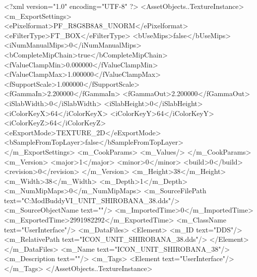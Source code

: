 <?xml version="1.0" encoding="UTF-8" ?>
<AssetObjects..TextureInstance>
	<m_ExportSettings>
		<ePixelformat>PF_R8G8B8A8_UNORM</ePixelformat>
		<eFilterType>FT_BOX</eFilterType>
		<bUseMips>false</bUseMips>
		<iNumManualMips>0</iNumManualMips>
		<bCompleteMipChain>true</bCompleteMipChain>
		<fValueClampMin>0.000000</fValueClampMin>
		<fValueClampMax>1.000000</fValueClampMax>
		<fSupportScale>1.000000</fSupportScale>
		<fGammaIn>2.200000</fGammaIn>
		<fGammaOut>2.200000</fGammaOut>
		<iSlabWidth>0</iSlabWidth>
		<iSlabHeight>0</iSlabHeight>
		<iColorKeyX>64</iColorKeyX>
		<iColorKeyY>64</iColorKeyY>
		<iColorKeyZ>64</iColorKeyZ>
		<eExportMode>TEXTURE_2D</eExportMode>
		<bSampleFromTopLayer>false</bSampleFromTopLayer>
	</m_ExportSettings>
	<m_CookParams>
		<m_Values/>
	</m_CookParams>
	<m_Version>
		<major>1</major>
		<minor>0</minor>
		<build>0</build>
		<revision>0</revision>
	</m_Version>
	<m_Height>38</m_Height>
	<m_Width>38</m_Width>
	<m_Depth>1</m_Depth>
	<m_NumMipMaps>0</m_NumMipMaps>
	<m_SourceFilePath text="C:\Users\asus\Documents\Firaxis ModBuddy\Civilization VI\temppic\ICON_UNIT_SHIROBANA_38.dds"/>
	<m_SourceObjectName text=""/>
	<m_ImportedTime>0</m_ImportedTime>
	<m_ExportedTime>2991982292</m_ExportedTime>
	<m_ClassName text="UserInterface"/>
	<m_DataFiles>
		<Element>
			<m_ID text="DDS"/>
			<m_RelativePath text="ICON_UNIT_SHIROBANA_38.dds"/>
		</Element>
	</m_DataFiles>
	<m_Name text="ICON_UNIT_SHIROBANA_38"/>
	<m_Description text=""/>
	<m_Tags>
		<Element text="UserInterface"/>
	</m_Tags>
</AssetObjects..TextureInstance>

